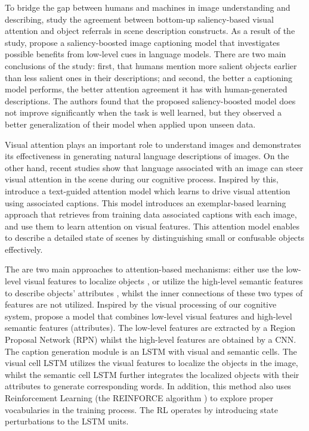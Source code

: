 To bridge the gap between humans and machines in image understanding and describing, \citet{Tavakoliy2017} study the agreement between bottom-up saliency-based visual attention and object referrals in scene description constructs. As a result of the study, \citeauthor{Tavakoliy2017} propose a saliency-boosted image captioning model that investigates possible benefits from low-level cues in language models. There are two main conclusions of the study: first, that humans mention more salient objects earlier than less salient ones in their descriptions; and second, the better a captioning model performs, the better attention agreement it has with human-generated descriptions. The authors found that the proposed saliency-boosted model does not improve significantly when the task is well learned, but they observed a better generalization of their model when applied upon unseen data.

Visual attention plays an important role to understand images and demonstrates its effectiveness in generating natural language descriptions of images. On the other hand, recent studies show that language associated with an image can steer visual attention in the scene during our cognitive process. Inspired by this, \citet{Mun2017} introduce a text-guided attention model which learns to drive visual attention using associated captions. This model introduces an exemplar-based learning approach that retrieves from training data associated captions with each image, and use them to learn attention on visual features. This attention model enables to describe a detailed state of scenes by distinguishing small or confusable objects effectively. 

The are two main approaches to attention-based mechanisms: either use the low-level visual features to localize objects \citep{Xu2015, Lu2017}, or utilize the high-level semantic features to describe objects’ attributes \citep{Wang2017, Wu2016}, whilst the inner connections of these two types of features are not utilized. Inspired by the visual
processing of our cognitive system, \citet{Li2018_VS-LSTM} propose a model that combines low-level visual features and high-level semantic features  (attributes). The low-level features are extracted by a Region Proposal Network (RPN) whilst the high-level features are obtained by a CNN. The caption generation module is an LSTM with visual and semantic cells. The visual cell LSTM utilizes the visual features to localize the objects in the image, whilst the semantic cell LSTM further integrates the localized objects with their attributes to generate corresponding words. In addition, this method also uses Reinforcement Learning (the REINFORCE algorithm \citep{Sutton1999}) to explore proper vocabularies in the training process. The RL operates by introducing state perturbations to the LSTM units.

